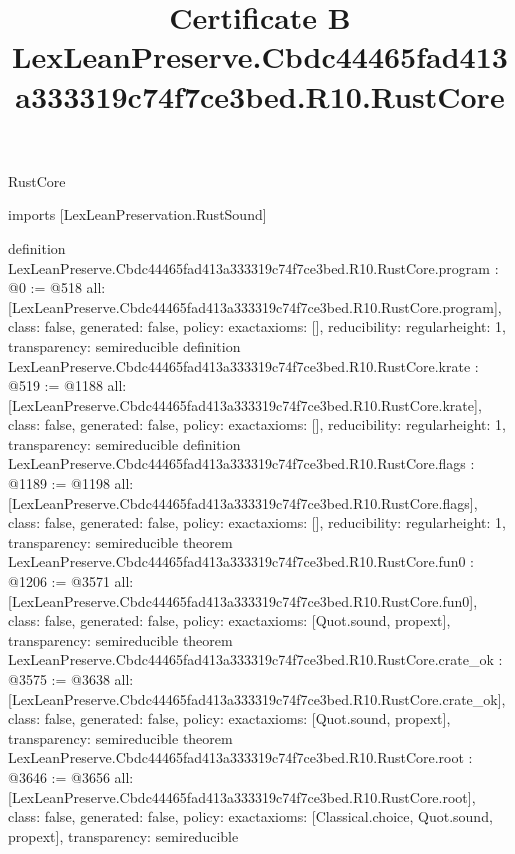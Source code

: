 \begin{lexlean}{RustCore}
\title{Certificate B LexLeanPreserve.Cbdc44465fad413a333319c74f7ce3bed.R10.RustCore}
\begin{coremodule}
imports [LexLeanPreservation.RustSound]

definition LexLeanPreserve.Cbdc44465fad413a333319c74f7ce3bed.R10.RustCore.program : @0 := @518 {
  all: [LexLeanPreserve.Cbdc44465fad413a333319c74f7ce3bed.R10.RustCore.program],
  class: false,
  generated: false,
  policy: exact{axioms: []},
  reducibility: regular{height: 1},
  transparency: semireducible
}
definition LexLeanPreserve.Cbdc44465fad413a333319c74f7ce3bed.R10.RustCore.krate : @519 := @1188 {
  all: [LexLeanPreserve.Cbdc44465fad413a333319c74f7ce3bed.R10.RustCore.krate],
  class: false,
  generated: false,
  policy: exact{axioms: []},
  reducibility: regular{height: 1},
  transparency: semireducible
}
definition LexLeanPreserve.Cbdc44465fad413a333319c74f7ce3bed.R10.RustCore.flags : @1189 := @1198 {
  all: [LexLeanPreserve.Cbdc44465fad413a333319c74f7ce3bed.R10.RustCore.flags],
  class: false,
  generated: false,
  policy: exact{axioms: []},
  reducibility: regular{height: 1},
  transparency: semireducible
}
theorem LexLeanPreserve.Cbdc44465fad413a333319c74f7ce3bed.R10.RustCore.fun0 : @1206 := @3571 {
  all: [LexLeanPreserve.Cbdc44465fad413a333319c74f7ce3bed.R10.RustCore.fun0],
  class: false,
  generated: false,
  policy: exact{axioms: [Quot.sound, propext]},
  transparency: semireducible
}
theorem LexLeanPreserve.Cbdc44465fad413a333319c74f7ce3bed.R10.RustCore.crate_ok : @3575 := @3638 {
  all: [LexLeanPreserve.Cbdc44465fad413a333319c74f7ce3bed.R10.RustCore.crate_ok],
  class: false,
  generated: false,
  policy: exact{axioms: [Quot.sound, propext]},
  transparency: semireducible
}
theorem LexLeanPreserve.Cbdc44465fad413a333319c74f7ce3bed.R10.RustCore.root : @3646 := @3656 {
  all: [LexLeanPreserve.Cbdc44465fad413a333319c74f7ce3bed.R10.RustCore.root],
  class: false,
  generated: false,
  policy: exact{axioms: [Classical.choice, Quot.sound, propext]},
  transparency: semireducible
}


\end{coremodule}
\end{lexlean}
